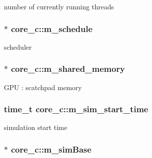 \label{classcore__c_a5abf4a988618cbe68a5aea86ca161530}
number of currently running threads \hypertarget{classcore__c_a50195be046236479bd8b4a9f3b46d8aa}{
\subsubsection[{m\_\-schedule}]{$\ast$ {\bf core\_\-c::m\_\-schedule}}}
\label{classcore__c_a50195be046236479bd8b4a9f3b46d8aa}
scheduler \hypertarget{classcore__c_a7677f44bc75a171c27870c8b8212c875}{
\subsubsection[{m\_\-shared\_\-memory}]{$\ast$ {\bf core\_\-c::m\_\-shared\_\-memory}}}
\label{classcore__c_a7677f44bc75a171c27870c8b8212c875}
GPU : scatchpad memory \hypertarget{classcore__c_a810b0f0bcacea384f78c3a0ec0329e5a}{
\subsubsection[{m\_\-sim\_\-start\_\-time}]{\setlength{\rightskip}{0pt plus 5cm}time\_\-t {\bf core\_\-c::m\_\-sim\_\-start\_\-time}}}
\label{classcore__c_a810b0f0bcacea384f78c3a0ec0329e5a}
simulation start time \hypertarget{classcore__c_a4bf560c9e3054151af77be43d8303134}{
\subsubsection[{m\_\-simBase}]{$\ast$ {\bf core\_\-c::m\_\-simBase}}}
